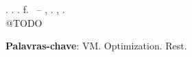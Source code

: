\begin{resumo}[RESUMO]
\begin{SingleSpacing}

\imprimirautorcitacao. \imprimirtitulo. \imprimirdata. \pageref {LastPage} f. \imprimirprojeto\ – \imprimirprograma, \imprimirinstituicao. \imprimirlocal, \imprimirdata.\\

@TODO

\textbf{Palavras-chave}: VM. Optimization. Rest.

\end{SingleSpacing}
\end{resumo}
